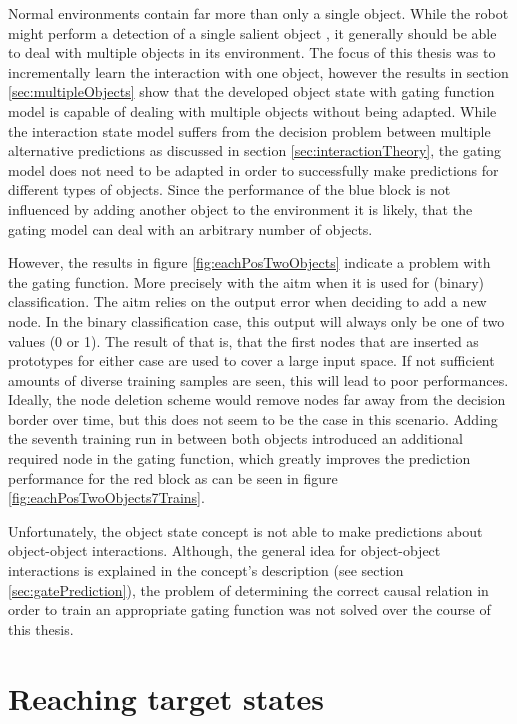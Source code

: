 Normal environments contain far more than only a single object. While the robot might perform a detection of a single salient object \cite{salient}, it generally should be able to deal with multiple objects in its environment. The focus of this thesis was to incrementally learn the interaction with one object, however the results in section \ref{sec:multipleObjects} show that the developed object state with gating function model is capable of dealing with multiple objects without being adapted.
While the interaction state model suffers from the decision problem between multiple alternative predictions as discussed in section \ref{sec:interactionTheory}, the gating model does not need to be adapted in order to successfully make predictions for different types of objects. Since the performance of the blue block is not influenced by adding another object to the environment it is likely, that the gating model can deal with an arbitrary number of objects.

However, the results in figure \ref{fig:eachPosTwoObjects} indicate a problem with the gating function. More precisely with the \gls{aitm} when it is used for (binary) classification. The \gls{aitm} relies on the output error when deciding to add a new node. In the binary classification case, this output will always only be one of two values (0 or 1). The result of that is, that the first nodes that are inserted as prototypes for either case are used to cover a large input space. 
If not sufficient amounts of diverse training samples are seen, this will lead to poor performances. Ideally, the node deletion scheme would remove nodes far away from the decision border over time, but this does not seem to be the case in this scenario. Adding the seventh training run in between both objects introduced an additional required node in the gating function, which greatly improves the prediction performance for the red block as can be seen in figure \ref{fig:eachPosTwoObjects7Trains}.


Unfortunately, the object state concept is not able to make predictions about object-object interactions. Although, the general idea for object-object interactions is explained in the concept's description (see section \ref{sec:gatePrediction}), the problem of determining the correct causal relation in order to train an appropriate gating function was not solved over the course of this thesis.

\section{Reaching target states}

